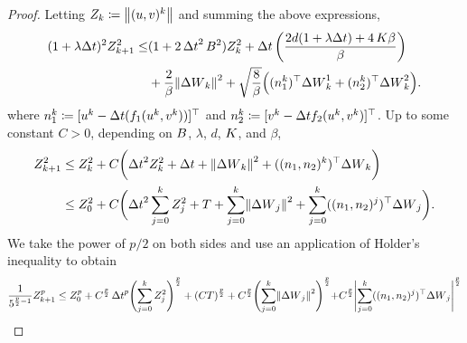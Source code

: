 \documentclass[11pt, twoside]{report}
\begin{document}
\begin{proof}

Letting $Z_k\coloneq \left\lVert(u,v)^k\right\rVert$ and summing the above expressions,
\begin{align*}
    (1+\lambda \deltat)^2 Z_{k+1}^2 \leq &(1+2\,\deltat^2\, \cinfty^2)Z_k^2 + \deltat \,\pa{\frac{2d(1+\lambda \deltat)+4\,\ccc\beta}{\beta} } 
    \\& + \frac2\beta\norm{\deltaw_k}^2 + \sqrt{\frac8\beta}\Bigl((n_1^k)^\top \deltaw^1_k +  (n_2^k)^\top \deltaw^2_k\Bigr).
\end{align*}
where  $n_1^k \coloneq [u^k - {\Delta t} (f_1(u^k,v^k))]^\top$ and $n_2^k \coloneq [v^k - {\Delta t} f_2(u^k, v^k)]^\top$. Up to some  constant $C>0$, depending on $B$, $\lambda$, $d$, $K$, and $\beta$,
\begin{align*}
     Z_{k+1}^2&\leq Z_k^2 + C\biggl(\deltat^2 Z_k^2 + \deltat + \norm{\deltaw_k}^2 + ((n_1,n_2)^k)^\top \deltaw_k\biggr)\\
     &\leq   Z_0^2 + C\biggl(\deltat^2 \sum_{j=0}^k Z_j^2 +T + \sum_{j=0}^k\norm{\deltaw_j}^2 + \sum_{j=0}^k ((n_1,n_2)^j)^\top \deltaw_j\biggr).
\end{align*}
We take the power of $p/2$ on both sides and use an application of Holder's inequality to obtain
\begin{align*}
  &\frac{1}{5^{\frac{p}{2}-1}} Z_{k+1}^p \leq 
  Z_0^p + C^{\frac{p}2}\,\deltat^p\Biggl( \sum_{j=0}^k Z_j^2\Biggr)
  ^{\frac{p}2} 
  + (CT)^{\frac{p}2}  + C^{\frac{p}2}\Biggl(\sum_{j=0}^k\norm{\deltaw_j}^2\Biggl)^{\frac{p}2} + C^{\frac{p}2}\Biggl|\sum_{j=0}^k ((n_1,n_2)^j)^\top \deltaw_j\Biggr|^{\frac{p}2}\\

\end{align*}
\end{proof}
\end{document}
